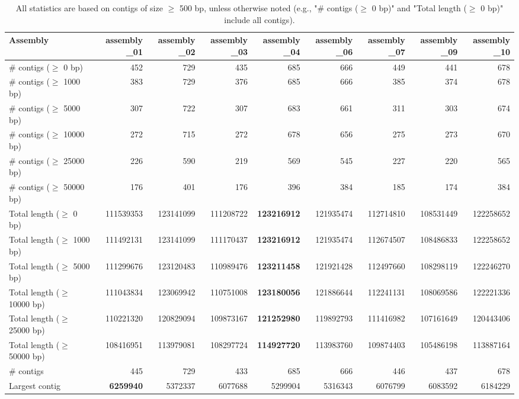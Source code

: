 \documentclass[12pt,a4paper]{article}
\begin{document}
\begin{table}[ht]
\begin{center}
\caption{All statistics are based on contigs of size $\geq$ 500 bp, unless otherwise noted (e.g., "\# contigs ($\geq$ 0 bp)" and "Total length ($\geq$ 0 bp)" include all contigs).}
\begin{tabular}{|l*{8}{|r}|}
\hline
Assembly & assembly\_01 & assembly\_02 & assembly\_03 & assembly\_04 & assembly\_06 & assembly\_07 & assembly\_09 & assembly\_10 \\ \hline
\# contigs ($\geq$ 0 bp) & 452 & 729 & 435 & 685 & 666 & 449 & 441 & 678 \\ \hline
\# contigs ($\geq$ 1000 bp) & 383 & 729 & 376 & 685 & 666 & 385 & 374 & 678 \\ \hline
\# contigs ($\geq$ 5000 bp) & 307 & 722 & 307 & 683 & 661 & 311 & 303 & 674 \\ \hline
\# contigs ($\geq$ 10000 bp) & 272 & 715 & 272 & 678 & 656 & 275 & 273 & 670 \\ \hline
\# contigs ($\geq$ 25000 bp) & 226 & 590 & 219 & 569 & 545 & 227 & 220 & 565 \\ \hline
\# contigs ($\geq$ 50000 bp) & 176 & 401 & 176 & 396 & 384 & 185 & 174 & 384 \\ \hline
Total length ($\geq$ 0 bp) & 111539353 & 123141099 & 111208722 & {\bf 123216912} & 121935474 & 112714810 & 108531449 & 122258652 \\ \hline
Total length ($\geq$ 1000 bp) & 111492131 & 123141099 & 111170437 & {\bf 123216912} & 121935474 & 112674507 & 108486833 & 122258652 \\ \hline
Total length ($\geq$ 5000 bp) & 111299676 & 123120483 & 110989476 & {\bf 123211458} & 121921428 & 112497660 & 108298119 & 122246270 \\ \hline
Total length ($\geq$ 10000 bp) & 111043834 & 123069942 & 110751008 & {\bf 123180056} & 121886644 & 112241131 & 108069586 & 122221336 \\ \hline
Total length ($\geq$ 25000 bp) & 110221320 & 120829094 & 109873167 & {\bf 121252980} & 119892793 & 111416982 & 107161649 & 120443406 \\ \hline
Total length ($\geq$ 50000 bp) & 108416951 & 113979081 & 108297724 & {\bf 114927720} & 113983760 & 109874403 & 105486198 & 113887164 \\ \hline
\# contigs & 445 & 729 & 433 & 685 & 666 & 446 & 437 & 678 \\ \hline
Largest contig & {\bf 6259940} & 5372337 & 6077688 & 5299904 & 5316343 & 6076799 & 6083592 & 6184229 \\ \hline

\end{tabular}
\end{center}
\end{table}
\end{document}
